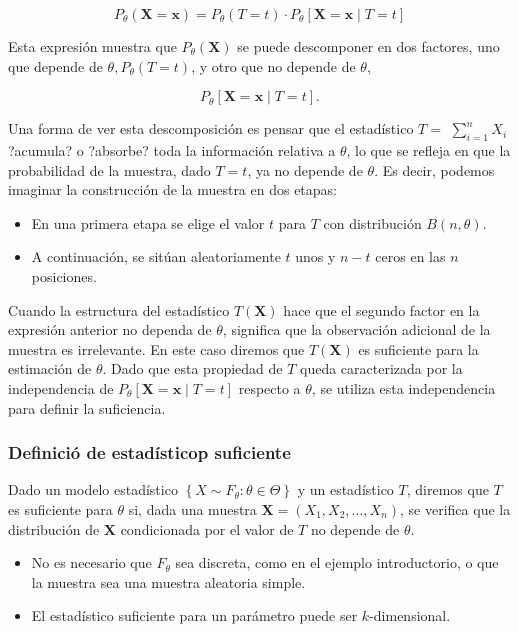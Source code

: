 \documentclass[
]{article}
\providecommand{\tightlist}{%
  \setlength{\itemsep}{0pt}\setlength{\parskip}{0pt}}
\begin{document}
\[
P_{\theta}(\mathbf{X}=\mathbf{x})=P_{\theta}(T=t) \cdot P_{\theta}[\mathbf{X}=\mathbf{x} \mid T=t]
\]

Esta expresión muestra que \(P_{\theta}(\mathbf{X})\) se puede descomponer en dos factores, uno que depende de \(\theta, P_{\theta}(T=t)\), y otro que no depende de \(\theta\),

\[
P_{\theta}[\mathbf{X}=\mathbf{x} \mid T=t] .
\]

Una forma de ver esta descomposición es pensar que el estadístico \(T=\) \(\sum_{i=1}^{n} X_{i}\) ?acumula? o ?absorbe? toda la información relativa a \(\theta\), lo que se refleja en que la probabilidad de la muestra, dado \(T=t\), ya no depende de \(\theta\). Es decir, podemos imaginar la construcción de la muestra en dos etapas:

\begin{itemize}
\tightlist
\item
  En una primera etapa se elige el valor \(t\) para \(T\) con distribución \(B(n, \theta)\).
\item
  A continuación, se sitúan aleatoriamente \(t\) unos y \(n-t\) ceros en las \(n\) posiciones.
\end{itemize}

Cuando la estructura del estadístico \(T(\mathbf{X})\) hace que el segundo factor en la expresión anterior no dependa de \(\theta\), significa que la observación adicional de la muestra es irrelevante. En este caso diremos que \(T(\mathbf{X})\) es suficiente para la estimación de \(\theta\). Dado que esta propiedad de \(T\) queda caracterizada por la independencia de \(P_{\theta}[\mathbf{X}=\mathbf{x} \mid T=t]\) respecto a \(\theta\), se utiliza esta independencia para definir la suficiencia.

\subsubsection{Definició de estadísticop suficiente}\label{definiciuxf3-de-estaduxedsticop-suficiente}

Dado un modelo estadístico \(\left\{X \sim F_{\theta}: \theta \in \Theta\right\}\) y un estadístico \(T\), diremos que \(T\) es suficiente para \(\theta\) si, dada una muestra \(\mathbf{X}=\left(X_{1}, X_{2}, \ldots, X_{n}\right)\), se verifica que la distribución de \(\mathbf{X}\) condicionada por el valor de \(T\) no depende de \(\theta\).

\begin{itemize}
\tightlist
\item
  No es necesario que \(F_{\theta}\) sea discreta, como en el ejemplo introductorio, o que la muestra sea una muestra aleatoria simple.
\item
  El estadístico suficiente para un parámetro puede ser \(k\)-dimensional.
\end{itemize}
\end{document}

